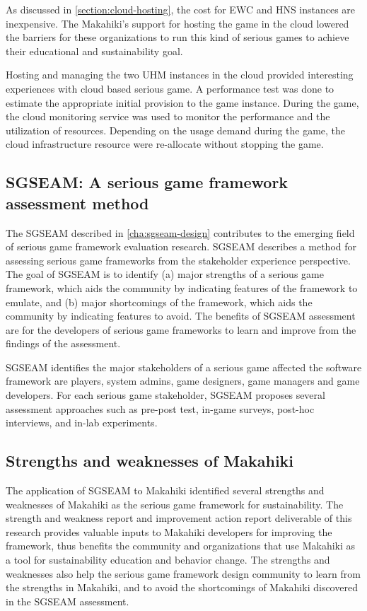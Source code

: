 As discussed in \autoref{section:cloud-hosting}, the cost for EWC and HNS instances are inexpensive. The Makahiki's support for hosting the game in the cloud lowered the barriers for these organizations to run this kind of serious games to achieve their educational and sustainability goal.

Hosting and managing the two UHM instances in the cloud provided interesting experiences with cloud based serious game. A performance test was done to estimate the appropriate initial provision to the game instance. During the game, the cloud monitoring service was used to monitor the performance and the utilization of resources. Depending on the usage demand during the game, the cloud infrastructure resource were re-allocate without stopping the game. 

\subsection{SGSEAM: A serious game framework assessment method}

The SGSEAM described in \autoref{cha:sgseam-design} contributes to the emerging field of serious game framework evaluation research. SGSEAM describes a method for assessing serious game frameworks from the stakeholder experience perspective. The goal of SGSEAM is to identify (a) major strengths of a serious game framework, which aids the community by indicating features of the framework to emulate, and
(b) major shortcomings of the framework, which aids the community by indicating features to avoid.
The benefits of SGSEAM assessment are for the developers of serious game frameworks 
to learn and improve from the findings of the assessment.

SGSEAM identifies the major stakeholders of a serious game affected the software framework are players, system admins, game designers, game managers and game developers. For each serious game stakeholder, SGSEAM proposes several assessment approaches such as pre-post test, in-game surveys, post-hoc interviews, and in-lab experiments.

\subsection{Strengths and weaknesses of Makahiki}

The application of SGSEAM to Makahiki identified several strengths and weaknesses of  Makahiki as the serious game framework for sustainability. The strength and weakness report and improvement action report deliverable of this research provides valuable inputs to Makahiki developers for improving the framework, thus benefits the community and organizations that use Makahiki as a tool for sustainability education and behavior change. The strengths and weaknesses also help the serious game framework design community to learn from the strengths in Makahiki, and to avoid the shortcomings of Makahiki discovered in the SGSEAM assessment. 

